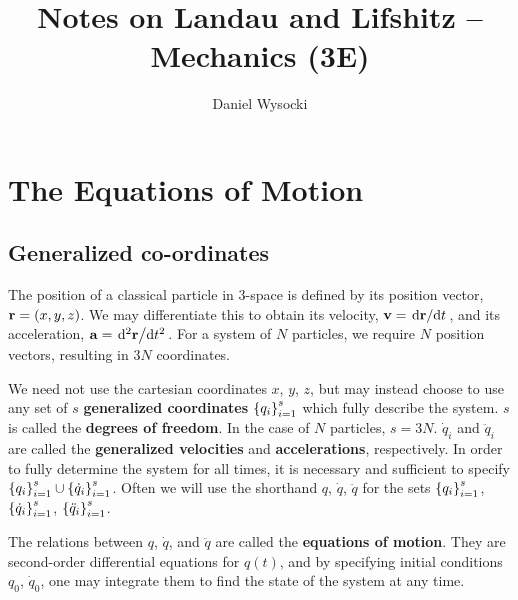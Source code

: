 \documentclass{book}
\title{Notes on Landau and Lifshitz -- Mechanics (3E)}
\author{Daniel Wysocki}
\date{}
\newcommand\normalsecnums{%
    \renewcommand\thesection{\thechapter.\arabic{section}}}
\let\origchapter\chapter
\renewcommand{\chapter}[1]{\normalsecnums
    \origchapter{#1}}
\begin{document}
\maketitle

\tableofcontents


\chapter{The Equations of Motion}


\section{Generalized co-ordinates}

The position of a classical particle in 3-space is defined by its position vector, $\vb{r} = (x, y, z)$. We may differentiate this to obtain its velocity, $\vb{v} = \dv*{\vb{r}}{t}$, and its acceleration, $\vb{a} = \dv*[2]{\vb{r}}{t}$. For a system of $N$ particles, we require $N$ position vectors, resulting in $3N$ coordinates.

We need not use the cartesian coordinates $x$, $y$, $z$, but may instead choose to use any set of $s$ \textbf{generalized coordinates} $\qty{q_i}_{i=1}^s$ which fully describe the system. $s$ is called the \textbf{degrees of freedom}. In the case of $N$ particles, $s = 3N$. $\dot{q}_i$ and $\ddot{q}_i$ are called the \textbf{generalized velocities} and \textbf{accelerations}, respectively. In order to fully determine the system for all times, it is necessary and sufficient to specify $\qty{q_i}_{i=1}^s \cup \qty{\dot{q}_i}_{i=1}^s$. Often we will use the shorthand $q$, $\dot{q}$, $\ddot{q}$ for the sets $\qty{q_i}_{i=1}^s$, $\qty{\dot{q}_i}_{i=1}^s$, $\qty{\ddot{q}_i}_{i=1}^s$.

The relations between $q$, $\dot{q}$, and $\ddot{q}$ are called the \textbf{equations of motion}. They are second-order differential equations for $q(t)$, and by specifying initial conditions $q_0$, $\dot{q}_0$, one may integrate them to find the state of the system at any time.


\end{document}
